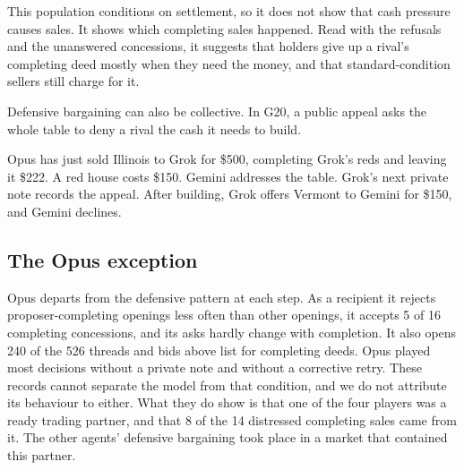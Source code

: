 This population conditions on settlement, so it does not show that cash pressure causes sales. It shows which completing sales happened. Read with the refusals and the unanswered concessions, it suggests that holders give up a rival's completing deed mostly when they need the money, and that standard-condition sellers still charge for it.

Defensive bargaining can also be collective. In G20, a public appeal asks the whole table to deny a rival the cash it needs to build.

Opus has just sold Illinois to Grok for \$500, completing Grok's reds and leaving it \$222. A red house costs \$150. Gemini addresses the table.
Grok's next private note records the appeal.
After building, Grok offers Vermont to Gemini for \$150, and Gemini declines.

\subsection{The Opus exception}

Opus departs from the defensive pattern at each step. As a recipient it rejects proposer-completing openings less often than other openings, it accepts 5 of 16 completing concessions, and its asks hardly change with completion. It also opens 240 of the 526 threads and bids above list for completing deeds. Opus played most decisions without a private note and without a corrective retry. These records cannot separate the model from that condition, and we do not attribute its behaviour to either. What they do show is that one of the four players was a ready trading partner, and that 8 of the 14 distressed completing sales came from it. The other agents' defensive bargaining took place in a market that contained this partner.
